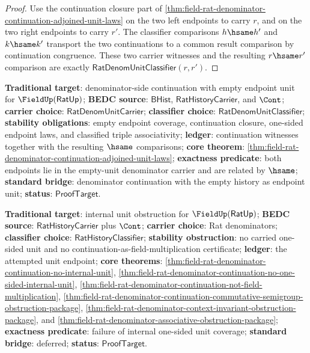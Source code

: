 \begin{proof}
Use the continuation closure part of
\autoref{thm:field-rat-denominator-continuation-adjoined-unit-laws} on the two
left endpoints to carry $r$, and on the two right endpoints to carry $r'$.
The classifier comparisons $h\hsame h'$ and $k\hsame k'$ transport the two
continuations to a common result comparison by continuation congruence. These
two carrier witnesses and the resulting $r\hsame r'$ comparison are exactly
$\mathsf{RatDenomUnitClassifier}(r,r')$.
\end{proof}

\textbf{Traditional target}: denominator-side continuation with empty endpoint
unit for $\FieldUp(\mathsf{RatUp})$; \textbf{BEDC source}:
$\mathsf{BHist}$, $\mathsf{RatHistoryCarrier}$, and $\Cont$; \textbf{carrier
choice}: $\mathsf{RatDenomUnitCarrier}$; \textbf{classifier choice}:
$\mathsf{RatDenomUnitClassifier}$; \textbf{stability obligations}: empty
endpoint coverage, continuation closure, one-sided endpoint laws, and
classified triple associativity; \textbf{ledger}: continuation witnesses
together with the resulting $\hsame$ comparisons; \textbf{core theorem}:
\autoref{thm:field-rat-denominator-continuation-adjoined-unit-laws};
\textbf{exactness predicate}: both endpoints lie in the empty-unit denominator
carrier and are related by $\hsame$; \textbf{standard bridge}: denominator
continuation with the empty history as endpoint unit; \textbf{status}:
$\mathsf{ProofTarget}$.

\textbf{Traditional target}: internal unit obstruction for
$\FieldUp(\mathsf{RatUp})$; \textbf{BEDC source}: $\mathsf{RatHistoryCarrier}$
plus $\Cont$; \textbf{carrier choice}: Rat denominators; \textbf{classifier
choice}: $\mathsf{RatHistoryClassifier}$; \textbf{stability obstruction}: no
carried one-sided unit and no continuation-as-field-multiplication certificate;
\textbf{ledger}: the attempted unit endpoint; \textbf{core theorems}:
\autoref{thm:field-rat-denominator-continuation-no-internal-unit},
\autoref{thm:field-rat-denominator-continuation-no-one-sided-internal-unit},
\autoref{thm:field-rat-denominator-continuation-not-field-multiplication},
\autoref{thm:field-rat-denominator-continuation-commutative-semigroup-obstruction-package},
\autoref{thm:field-rat-denominator-context-invariant-obstruction-package},
and
\autoref{thm:field-rat-denominator-associative-obstruction-package};
\textbf{exactness predicate}: failure of internal one-sided unit coverage;
\textbf{standard bridge}: deferred; \textbf{status}: $\mathsf{ProofTarget}$.
